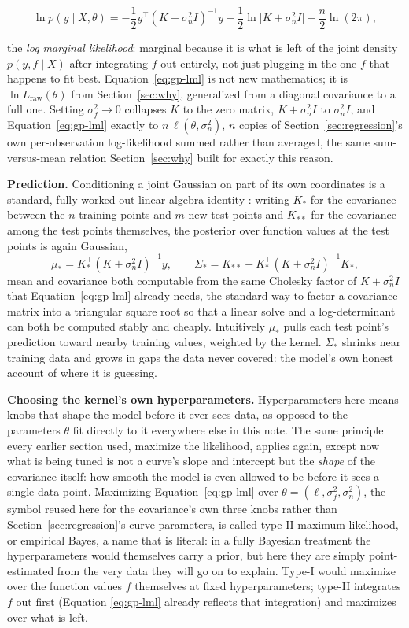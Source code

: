 \documentclass[11pt]{article}
\begin{document}
\begin{equation}
\ln p(y \mid X,\theta) = -\frac12 y^\top (K+\sigma_n^2 I)^{-1} y
- \frac12 \ln\lvert K+\sigma_n^2 I\rvert - \frac{n}{2}\ln(2\pi),
\label{eq:gp-lml}
\end{equation}

the \emph{log marginal likelihood}: marginal because it is what is
left of the joint density $p(y,f\mid X)$ after integrating $f$ out
entirely, not just plugging in the one $f$ that happens to fit best.
Equation~\eqref{eq:gp-lml} is not new mathematics; it is
$\ln L_{\text{raw}}(\theta)$ from Section~\ref{sec:why}, generalized
from a diagonal covariance to a full one. Setting $\sigma_f^2 \to 0$
collapses $K$ to the zero matrix, $K+\sigma_n^2 I$ to $\sigma_n^2 I$,
and Equation~\eqref{eq:gp-lml} exactly to $n\,\ell(\theta,\sigma_n^2)$,
$n$ copies of Section~\ref{sec:regression}'s own per-observation
log-likelihood summed rather than averaged, the same sum-versus-mean
relation Section~\ref{sec:why} built for exactly this reason.

\textbf{Prediction.} Conditioning a joint Gaussian on part of its own
coordinates is a standard, fully worked-out linear-algebra identity
\citep{rasmussen2006}: writing $K_*$ for the covariance between the
$n$ training points and $m$ new test points and $K_{**}$ for the
covariance among the test points themselves, the posterior over
function values at the test points is again Gaussian,
$$\mu_* = K_*^\top (K+\sigma_n^2 I)^{-1} y, \qquad
\Sigma_* = K_{**} - K_*^\top (K+\sigma_n^2 I)^{-1} K_*,$$
mean and covariance both computable from the same Cholesky factor of
$K+\sigma_n^2 I$ that Equation~\eqref{eq:gp-lml} already needs, the
standard way to factor a covariance matrix into a triangular square
root so that a linear solve and a log-determinant can both be computed
stably and cheaply. Intuitively
$\mu_*$ pulls each test point's prediction toward nearby training
values, weighted by the kernel. $\Sigma_*$ shrinks near training
data and grows in gaps the data never covered: the model's own honest
account of where it is guessing.

\textbf{Choosing the kernel's own hyperparameters.} Hyperparameters
here means knobs that shape the model before it ever sees data, as
opposed to the parameters $\theta$ fit directly to it everywhere else
in this note. The same principle every earlier section used, maximize
the likelihood, applies again, except now what is being tuned is not
a curve's slope and intercept but the \emph{shape} of the covariance
itself: how smooth the model is even allowed to be before it sees a
single data point. Maximizing Equation~\eqref{eq:gp-lml} over $\theta
= (\ell,\sigma_f^2,\sigma_n^2)$, the symbol reused here for the
covariance's own three knobs rather than Section~\ref{sec:regression}'s
curve parameters, is called type-II maximum likelihood, or empirical
Bayes, a name that is literal: in a fully Bayesian treatment the
hyperparameters would themselves carry a prior, but here they are
simply point-estimated from the very data they will go on to explain.
Type-I would maximize over the function values $f$ themselves at fixed
hyperparameters; type-II integrates $f$ out first (Equation
\eqref{eq:gp-lml} already reflects that integration) and maximizes
over what is left.
\end{document}

